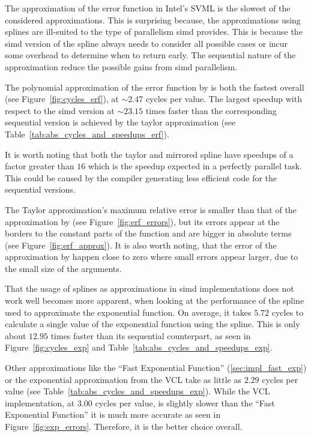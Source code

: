 \documentclass[a4paper, 11pt]{memoir}
\begin{document}
    The approximation of the error function in Intel's SVML is the slowest of the considered approximations. This is
    surprising because, the approximations using splines are ill-suited to the type of parallelism \gls{simd} provides.
    This is because the \gls{simd} version of the spline always needs to consider all possible cases or incur some overhead
    to determine when to return early. The sequential nature of the approximation reduce the possible gains from \gls{simd}
    parallelism.

    The polynomial approximation of the error function by \citeauthor{AbraSteg72} is both the fastest overall (see
    Figure~\ref{fig:cycles_erf}), at $\sim2.47$ cycles per value. The largest speedup with respect to the
    \gls{simd} version at $\sim23.15$ times faster than the corresponding sequential version is achieved by the taylor
    approximation (see Table~\ref{tab:abs_cycles_and_speedups_erf}).

    It is worth noting that both the taylor and mirrored spline have speedups of a factor greater than $16$ which is the
    speedup expected in a perfectly parallel task. This could be caused by the compiler generating less efficient code
    for the sequential versions.

    The Taylor approximation's maximum relative error is smaller than that of the approximation by \citeauthor{AbraSteg72}
    (see Figure~\ref{fig:erf_errors}), but its errors appear at the borders to the constant parts of the function and
    are bigger in absolute terms (see Figure~\ref{fig:erf_approx}). It is also worth noting, that the error of the
    approximation by \citeauthor{AbraSteg72} happen close to zero where small errors appear larger, due to the small
    size of the arguments.

    That the usage of splines as approximations in \gls{simd} implementations does not work well becomes more apparent,
    when looking at the performance of the spline used to approximate the exponential function. On average, it takes $5.72$
    cycles to calculate a single value of the exponential function using the spline. This is only about $12.95$ times faster
    than its sequential counterpart, as seen in Figure~\ref{fig:cycles_exp} and Table~\ref{tab:abs_cycles_and_speedups_exp}.

    Other approximations like the \enquote{Fast Exponential Function} (\ref{sec:impl_fast_exp}) or the exponential
    approximation from the VCL take as little as $2.29$ cycles per value (see Table~\ref{tab:abs_cycles_and_speedups_exp}).
    While the VCL implementation, at $3.00$ cycles per value, is slightly slower than the \enquote{Fast Exponential Function}
    it is much more accurate as seen in Figure~\ref{fig:exp_errors}. Therefore, it is the better choice overall.
\end{document}
